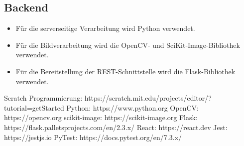 \documentclass[conference]{IEEEtran}
\begin{document}
\subsection{Backend}
\begin{itemize}
	\item Für die serverseitige Verarbeitung wird Python \cite{python} verwendet. 
	\item Für die Bildverarbeitung wird die OpenCV- \cite{opencv} und SciKit-Image-Bibliothek \cite{scikit-image} verwendet. 
	\item Für die Bereitstellung der REST-Schnittstelle wird die Flask-Bibliothek \cite{flask} verwendet.
\end{itemize}

\begin{thebibliography}{00}
	 Scratch Programmierung: https://scratch.mit.edu/projects/editor/?tutorial=getStarted
	 Python: https://www.python.org
	 OpenCV: https://opencv.org
	 scikit-image: https://scikit-image.org
	 Flask: https://flask.palletsprojects.com/en/2.3.x/
	 React: https://react.dev
	 Jest: https://jestjs.io
	 PyTest: https://docs.pytest.org/en/7.3.x/
\end{thebibliography}
\vspace{12pt}
\end{document}
